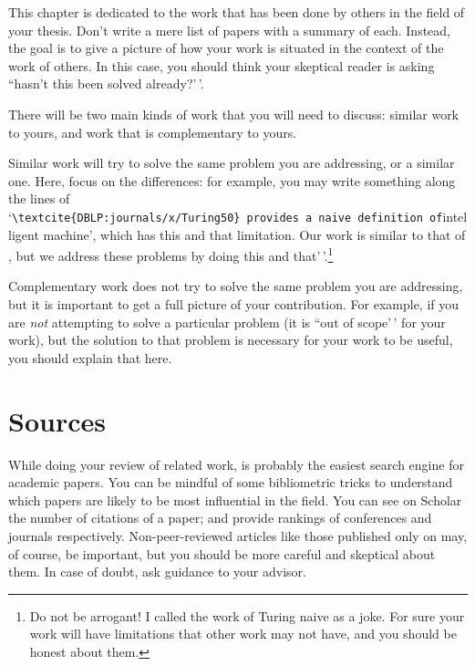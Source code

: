 This chapter is dedicated to the work that has been done by others in
the field of your thesis. Don't write a mere list of papers with a
summary of each. Instead, the goal is to give a picture of how your work
is situated in the context of the work of others. In this case, you
should think your skeptical reader is asking ``hasn't this been solved
already?'\,'.

There will be two main kinds of work that you will need to discuss:
similar work to yours, and work that is complementary to yours.

Similar work will try to solve the same problem you are addressing, or a
similar one. Here, focus on the differences: for example, you may write
something along the lines of
`\texttt{\textbackslash{}textcite\{DBLP:journals/x/Turing50\}\ provides\ a\ naive\ definition\ of}intelligent
machine', which has this and that limitation. Our work is similar to
that of \citeauthor{DBLP:journals/x/Turing50}, but we address these
problems by doing this and
that'\,'.\footnote{Do not be arrogant! I called the work of Turing naive as a joke.
For sure your work will have limitations that other work may not have, and you should be honest about them.}

Complementary work does not try to solve the same problem you are
addressing, but it is important to get a full picture of your
contribution. For example, if you are \emph{not} attempting to solve a
particular problem (it is ``out of scope'\,' for your work), but the
solution to that problem is necessary for your work to be useful, you
should explain that here.

\section{Sources}

While doing your review of related work,
 is probably the
easiest search engine for academic papers. You can be mindful of some
bibliometric tricks to understand which papers are likely to be most
influential in the field. You can see on Scholar the number of citations
of a paper;  and
 provide rankings of
conferences and journals respectively. Non-peer-reviewed articles like
those published only on  may, of
course, be important, but you should be more careful and skeptical about
them. In case of doubt, ask guidance to your advisor.

